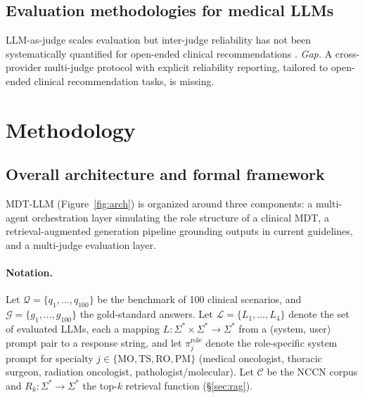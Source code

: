 \documentclass[final, 11pt, 3p]{elsarticle}
\newcommand{\MDTLLM}{\textsc{MDT-LLM}}
\begin{document}
\subsection{Evaluation methodologies for medical LLMs}
LLM-as-judge \cite{Zheng2023MTBench,Chiang2024,Lievin2024} scales
evaluation but inter-judge reliability has not been systematically
quantified for open-ended clinical recommendations
\cite{Liu2023Evaluation}. \emph{Gap.} A cross-provider multi-judge
protocol with explicit reliability reporting, tailored to open-ended
clinical recommendation tasks, is missing.

\section{Methodology}
\label{sec:method}

\subsection{Overall architecture and formal framework}
\label{sec:arch}
\MDTLLM{} (Figure~\ref{fig:arch}) is organized around three components:
a multi-agent orchestration layer simulating the role structure of a
clinical MDT, a retrieval-augmented generation pipeline grounding
outputs in current guidelines, and a multi-judge evaluation layer.

\paragraph{Notation.} Let $\mathcal{Q} = \{q_1, \ldots, q_{100}\}$ be
the benchmark of 100 clinical scenarios, and $\mathcal{G} =
\{g_1, \ldots, g_{100}\}$ the gold-standard answers. Let $\mathcal{L}
= \{L_1, \ldots, L_4\}$ denote the set of evaluated LLMs, each a
mapping $L : \Sigma^{*} \times \Sigma^{*} \to \Sigma^{*}$ from a
(system, user) prompt pair to a response string, and let
$\pi_j^{\text{role}}$ denote the role-specific system prompt for
specialty $j \in \{\mathrm{MO}, \mathrm{TS}, \mathrm{RO}, \mathrm{PM}\}$
(medical oncologist, thoracic surgeon, radiation oncologist,
pathologist/molecular). Let $\mathcal{C}$ be the NCCN corpus and
$R_k : \Sigma^{*} \to \Sigma^{*}$ the top-$k$ retrieval function
(\S\ref{sec:rag}).
\end{document}
